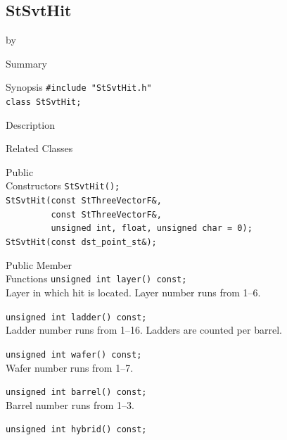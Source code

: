 \documentclass[twoside]{article}
\newcommand{\entrylabel}[1]{\mbox{\textbf{{#1}}}\hfil}%
\newenvironment{entry}
{\begin{list}{}%
    {\renewcommand{\makelabel}{\entrylabel}%
     \setlength{\labelwidth}{90pt}%
     \setlength{\leftmargin}{\labelwidth}
     \advance\leftmargin by \labelsep%
      }%
    }%
  {\end{list}}
\newcommand{\Entrylabel}[1]%
{\raisebox{0pt}[1ex][0pt]{\makebox[\labelwidth][l]%
    {\parbox[t]{\labelwidth}{\hspace{0pt}\textbf{{#1}}}}}}
\newenvironment{Entry}%
{\renewcommand{\entrylabel}{\Entrylabel}\begin{entry}}%
  {\end{entry}}
\begin{document}
\subsection{StSvtHit}
\label{sec:StSvtHit}
\begin{Entry}
\item[Summary]
\item[Synopsis]
    \verb+#include "StSvtHit.h"+\\
    \verb+class StSvtHit;+\\
\item[Description]
\item[Related Classes]
\item[Public\\ Constructors]
    \verb+StSvtHit();+\\
    \verb+StSvtHit(const StThreeVectorF&,+\\
    \verb+         const StThreeVectorF&,+\\
    \verb+         unsigned int, float, unsigned char = 0);+\\
    \verb+StSvtHit(const dst_point_st&);+\\
\item[Public Member\\ Functions]
    \verb+unsigned int layer() const;+\\
    Layer in which hit is located. Layer number runs from 1--6.

    \verb+unsigned int ladder() const;+\\
    Ladder number runs from 1--16. Ladders
    are counted per barrel.
    
    \verb+unsigned int wafer() const;+\\
    Wafer number runs from 1--7.
    
    \verb+unsigned int barrel() const;+\\
    Barrel number runs from 1--3.
    
    \verb+unsigned int hybrid() const;+\\
\end{Entry}
\clearpage
\end{document}
